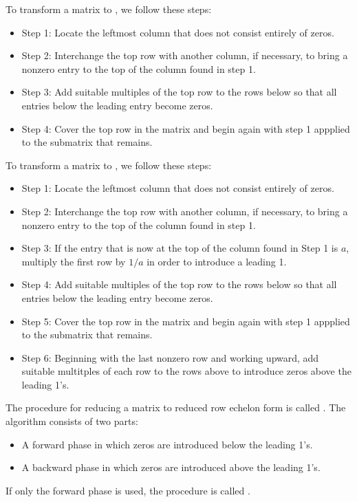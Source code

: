     \par To transform a matrix to , we follow these
      steps:
    \begin{itemize}
        \item Step 1: Locate the leftmost column that does not consist
          entirely of zeros.
        \item Step 2: Interchange the top row with another column, if
          necessary, to bring a nonzero entry to the top of the column
          found in step 1.
        \item Step 3: Add suitable multiples of the top row to the rows
          below so that all entries below the leading entry become zeros.
        \item Step 4: Cover the top row in the matrix and begin again
          with step 1 appplied to the submatrix that remains.
    \end{itemize}
    \par To transform a matrix to , we follow
      these steps:
    \begin{itemize}
      \item Step 1: Locate the leftmost column that does not consist
        entirely of zeros.
      \item Step 2: Interchange the top row with another column, if
        necessary, to bring a nonzero entry to the top of the column
        found in step 1.
      \item Step 3: If the entry that is now at the top of the column
        found in Step 1 is $a$, multiply the first row by $1/a$ in
        order to introduce a leading 1.
      \item Step 4: Add suitable multiples of the top row to the rows
        below so that all entries below the leading entry become zeros.
      \item Step 5: Cover the top row in the matrix and begin again
        with step 1 appplied to the submatrix that remains.
      \item Step 6: Beginning with the last nonzero row and working upward,
          add suitable multitples of each row to the rows above to
          introduce zeros above the leading 1's.
    \end{itemize}
    \par The procedure for reducing a matrix to reduced row echelon form is
      called . The algorithm consists of two
      parts:
    \begin{itemize}
      \item A forward phase in which zeros are introduced below the leading
        1's.
      \item A backward phase in which zeros are introduced above the leading
        1's.
    \end{itemize}
    \par If only the forward phase is used, the procedure is called
      .
  
